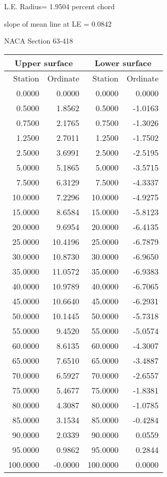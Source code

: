\documentclass[11pt]{book}
\begin{document}
L.E. Radius=  1.9504 percent chord


 slope of mean line at LE =  0.0842
 \newpage
  \label{s63-418}
 \begin{Large}
 NACA Section 63-418
 \end{Large}
  
 \vspace{8mm}
 \begin{tabular}{|r|r|r|r|} \hline 
 \multicolumn{2}{|c|}{Upper surface} & \multicolumn{2}{|c|}{Lower surface} \\
 \hline
 Station & Ordinate & Station & Ordinate \\
 \hline
0.0000 & 0.0000 & 0.0000 & 0.0000 \\
0.5000 & 1.8562 & 0.5000 & -1.0163 \\
0.7500 & 2.1765 & 0.7500 & -1.3026 \\
1.2500 & 2.7011 & 1.2500 & -1.7502 \\
2.5000 & 3.6991 & 2.5000 & -2.5195 \\
5.0000 & 5.1865 & 5.0000 & -3.5715 \\
7.5000 & 6.3129 & 7.5000 & -4.3337 \\
10.0000 & 7.2296 & 10.0000 & -4.9275 \\
15.0000 & 8.6584 & 15.0000 & -5.8123 \\
20.0000 & 9.6954 & 20.0000 & -6.4135 \\
25.0000 & 10.4196 & 25.0000 & -6.7879 \\
30.0000 & 10.8730 & 30.0000 & -6.9650 \\
35.0000 & 11.0572 & 35.0000 & -6.9383 \\
40.0000 & 10.9789 & 40.0000 & -6.7065 \\
45.0000 & 10.6640 & 45.0000 & -6.2931 \\
50.0000 & 10.1445 & 50.0000 & -5.7318 \\
55.0000 & 9.4520 & 55.0000 & -5.0574 \\
60.0000 & 8.6135 & 60.0000 & -4.3007 \\
65.0000 & 7.6510 & 65.0000 & -3.4887 \\
70.0000 & 6.5927 & 70.0000 & -2.6557 \\
75.0000 & 5.4677 & 75.0000 & -1.8381 \\
80.0000 & 4.3087 & 80.0000 & -1.0785 \\
85.0000 & 3.1534 & 85.0000 & -0.4284 \\
90.0000 & 2.0339 & 90.0000 & 0.0559 \\
95.0000 & 0.9862 & 95.0000 & 0.2844 \\
100.0000 & -0.0000 & 100.0000 & 0.0000 \\
 \hline 
 \end{tabular}
\end{document}
